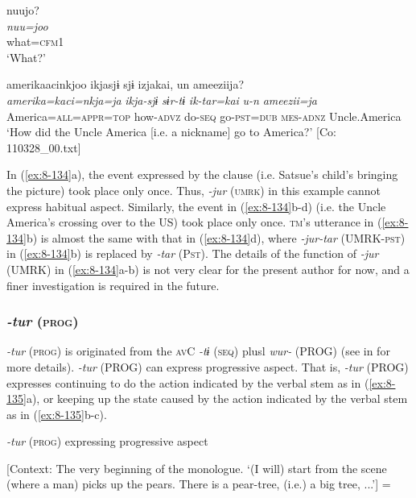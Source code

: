 \ex
{\US}
\glll   nuujo?\\
\textit{nuu=joo}\\
what=\textsc{cfm1}\\
\glt ‘What?’

\ex
{\TM}
\glll  amerikaacinkjoo  ikjasjɨ  sjɨ  izjakai,      un  ameeziija?\\
\textit{amerika=kaci=nkja=ja}  \textit{ikja-sjɨ}  \textit{sɨr-tɨ}  \textit{ik-tar=kai}      \textit{u-n}  \textit{ameezii=ja}\\
America=\textsc{all}=\textsc{appr}=\textsc{top}  how-\textsc{advz}  do-\textsc{seq}  go-\textsc{pst}=\textsc{dub}   \textsc{mes}-\textsc{adnz}  Uncle.America\\
\glt ‘How did the Uncle America [i.e. a nickname] go to America?’ [Co: 110328\_00.txt]
\z
\z

In (\ref{ex:8-134}a), the event expressed by the clause (i.e. Satsue’s child’s bringing the picture) took place only once. Thus, \textit{-jur} (\textsc{umrk}) in this example cannot express habitual aspect. Similarly, the event in (\ref{ex:8-134}b-d) (i.e. the Uncle America’s crossing over to the US) took place only once. \textsc{tm}’s utterance in (\ref{ex:8-134}b) is almost the same with that in (\ref{ex:8-134}d), where \textit{-jur-tar} (UMRK-\textsc{pst}) in (\ref{ex:8-134}b) is replaced by \textit{-tar} (P\textsc{st}). The details of the function of \textit{-jur} (UMRK) in (\ref{ex:8-134}a-b) is not very clear for the present author for now, and a finer investigation is required in the future.

\subsubsection{\textit{-tur} (\textsc{prog})}

\textit{-tur} (\textsc{prog}) is originated from the \textsc{av}C \textit{-tɨ} (\textsc{seq}) plusl \textit{wur-} (PROG) (see  in  for more details). \textit{-tur} (PROG) can express progressive aspect. That is, \textit{-tur} (PROG) expresses continuing to do the action indicated by the verbal stem as in (\ref{ex:8-135}a), or keeping up the state caused by the action indicated by the verbal stem as in (\ref{ex:8-135}b-c).

\ea\label{ex:8-135}
  \textit{-tur} (\textsc{prog}) expressing progressive aspect

  [Context: The very beginning of the monologue. {\TM}
\glll ‘(I will) start from the scene (where a man) picks up the pears. There is a pear-tree, (i.e.) a big tree, ...’] = \\

